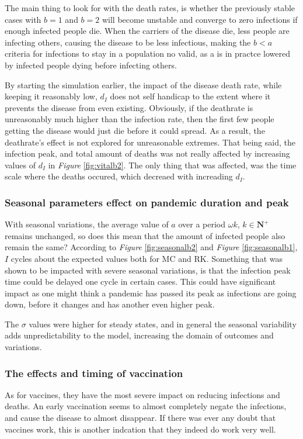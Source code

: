The main thing to look for with the death rates, is whether the previously stable cases with $b=1$ and $b=2$ will become unstable and converge to zero infections if enough infected people die.
When the carriers of the disease die, less people are infecting others, causing the disease to be less infectious, making the $b<a$ criteria for infections to stay in a population no valid, as a is in practce lowered by infected people dying before infecting others.

By starting the simulation earlier, the impact of the disease death rate, while keeping it reasonably low, $d_I$ does not self handicap to the extent where it prevents the disease from even existing.
Obviously, if the deathrate is unreasonably much higher than the infection rate, then the first few people getting the disease would just die before it could spread. 
As a result, the deathrate's effect is not explored for unreasonable extremes. 
That being said, the infection peak, and total amount of deaths was not really affected by increasing values of $d_I$ in \textit{Figure} \ref{fig:vitalb2}. The only thing that was affected, was the time scale where the deaths occured, which decreaed with increading $d_I$.
\subsubsection{Seasonal parameters effect on pandemic duration and peak}

With seasonal variations, the average value of $a$ over a period $\omega k$, $k \in \mathbf{N} ^+$ remains unchanged, so does this mean that the amount of infected people also remain the same?
According to \textit{Figure} \ref{fig:seasonalb2} and \textit{Figure} \ref{fig:seasonalb1}, $I$ cycles about the expected values both for MC and RK.
Something that was shown to be impacted with severe seasonal variations, is that the infection peak time could be delayed one cycle in certain cases. 
This could have significant impact as one might think a pandemic has passed its peak as infections are going down, before it changes and has another even higher peak.

The $\sigma$ values were higher for steady states, and in general the seasonal variability adds unpredictability to the model, increasing the domain of outcomes and variations.
\subsubsection{The effects and timing of vaccination}
As for vaccines, they have the most severe impact on reducing infections and deaths. 
An early vaccination seems to almost completely negate the infections, and cause the disease to almost disappear.
If there was ever any doubt that vaccines work, this is another indcation that they indeed do work very well.

